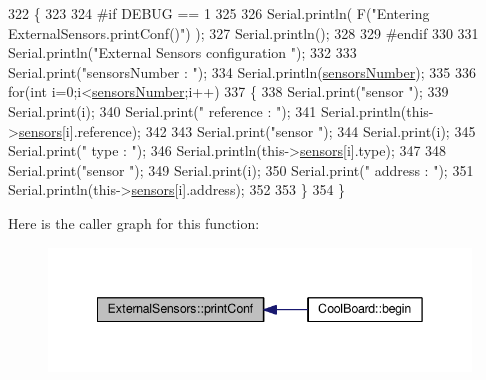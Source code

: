 \begin{DoxyCode}
322 \{
323 
324 \textcolor{preprocessor}{#if DEBUG == 1}
325 
326     Serial.println( F(\textcolor{stringliteral}{"Entering ExternalSensors.printConf()"}) );
327     Serial.println();
328 
329 \textcolor{preprocessor}{#endif }
330 
331     Serial.println(\textcolor{stringliteral}{"External Sensors configuration "});
332 
333     Serial.print(\textcolor{stringliteral}{"sensorsNumber : "});
334     Serial.println(\hyperlink{classExternalSensors_a58e4fbf9adeae787d92be5fa33043b5d}{sensorsNumber});
335 
336     \textcolor{keywordflow}{for}(\textcolor{keywordtype}{int} i=0;i<\hyperlink{classExternalSensors_a58e4fbf9adeae787d92be5fa33043b5d}{sensorsNumber};i++)
337     \{
338         Serial.print(\textcolor{stringliteral}{"sensor "});
339         Serial.print(i);
340         Serial.print(\textcolor{stringliteral}{" reference : "});
341         Serial.println(this->\hyperlink{classExternalSensors_a284233f884fcf00154a44740cf1d9e1e}{sensors}[i].reference);
342 
343         Serial.print(\textcolor{stringliteral}{"sensor "});
344         Serial.print(i);
345         Serial.print(\textcolor{stringliteral}{" type : "});
346         Serial.println(this->\hyperlink{classExternalSensors_a284233f884fcf00154a44740cf1d9e1e}{sensors}[i].type);
347                 
348         Serial.print(\textcolor{stringliteral}{"sensor "});
349         Serial.print(i);
350         Serial.print(\textcolor{stringliteral}{" address : "});
351         Serial.println(this->\hyperlink{classExternalSensors_a284233f884fcf00154a44740cf1d9e1e}{sensors}[i].address);
352     
353     \}
354 \}
\end{DoxyCode}
Here is the caller graph for this function\+:\nopagebreak
\begin{figure}[H]
\begin{center}
\leavevmode
\includegraphics[width=342pt]{classExternalSensors_a78c2bf55084435dd51d3c559b2d3c6f3_icgraph}
\end{center}
\end{figure}
\mbox{\label{classExternalSensors_a53177b81eca3be89508b5511ddcd00fc}} 

